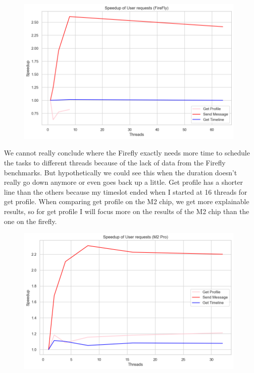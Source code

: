 \documentclass[a4paper]{article}
\begin{document}
\begin{figure}[H]
	\centering
	\includegraphics[width = \linewidth]{Images/SpeedupURMeanFireflyCom.png}
	\caption{}
\end{figure}
We cannot really conclude where the Firefly exactly needs more time to schedule the tasks to different threads because of the lack of data from the Firefly benchmarks. But hypothetically we could see this when the duration doesn't really go down anymore or even goes back up a little. Get profile has a shorter line than the others because my timeslot ended when I started at 16 threads for get profile. When comparing get profile on the M2 chip, we get more explainable results, so for get profile I will focus more on the results of the M2 chip than the one on the firefly. 
\begin{figure}[H]
	\centering
	\includegraphics[width = \linewidth]{Images/SpeedupURMeanCom.png}
	\caption{}
\end{figure}
\end{document}
